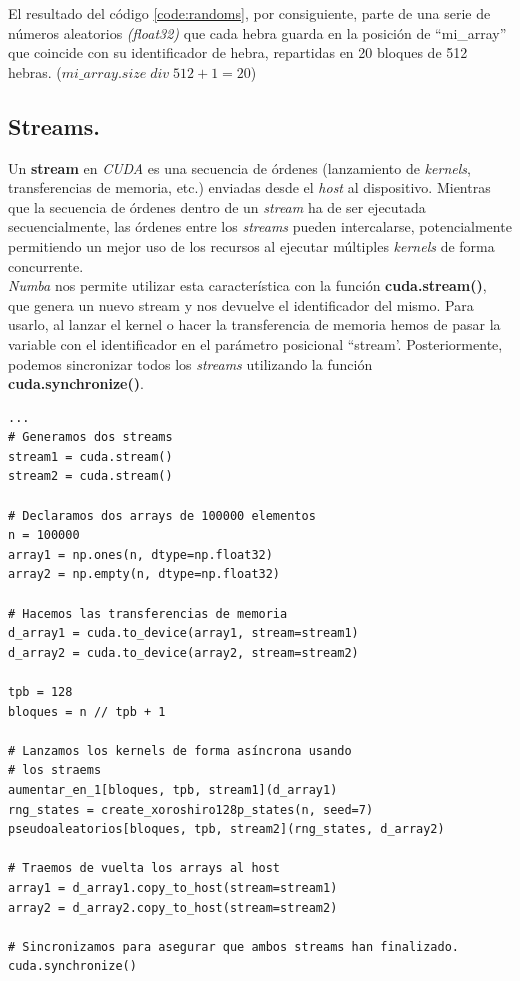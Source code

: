 El resultado del código \ref{code:randoms}, por consiguiente, parte de una serie de números aleatorios \textit{(float32)} que cada hebra guarda en la posición de ``mi\_array'' que coincide con su identificador de hebra, repartidas en 20 bloques de 512 hebras. ($mi\_array.size \;div \;512 + 1 = 20$)\\

\subsection{Streams.}
Un \textbf{stream} en \textit{CUDA} es una secuencia de órdenes (lanzamiento de \textit{kernels}, transferencias de memoria, etc.) enviadas desde el \textit{host} al dispositivo. Mientras que la secuencia de órdenes dentro de un \textit{stream} ha de ser ejecutada secuencialmente, las órdenes entre los \textit{streams} pueden intercalarse, potencialmente permitiendo un mejor uso de los recursos al ejecutar múltiples \textit{kernels} de forma concurrente. \\

\textit{Numba} nos permite utilizar esta característica con la función \textbf{cuda.stream()}, que genera un nuevo stream y nos devuelve el identificador del mismo. Para usarlo, al lanzar el kernel o hacer la transferencia de memoria hemos de pasar la variable con el identificador en el parámetro posicional ``stream'. Posteriormente, podemos sincronizar todos los \textit{streams} utilizando la función \textbf{cuda.synchronize()}. \\

\begin{code}
\begin{verbatim}
...
# Generamos dos streams
stream1 = cuda.stream()
stream2 = cuda.stream()

# Declaramos dos arrays de 100000 elementos
n = 100000 
array1 = np.ones(n, dtype=np.float32)
array2 = np.empty(n, dtype=np.float32)

# Hacemos las transferencias de memoria
d_array1 = cuda.to_device(array1, stream=stream1)
d_array2 = cuda.to_device(array2, stream=stream2)

tpb = 128
bloques = n // tpb + 1

# Lanzamos los kernels de forma asíncrona usando
# los straems
aumentar_en_1[bloques, tpb, stream1](d_array1)
rng_states = create_xoroshiro128p_states(n, seed=7)
pseudoaleatorios[bloques, tpb, stream2](rng_states, d_array2)

# Traemos de vuelta los arrays al host
array1 = d_array1.copy_to_host(stream=stream1)
array2 = d_array2.copy_to_host(stream=stream2)

# Sincronizamos para asegurar que ambos streams han finalizado.
cuda.synchronize()
\end{verbatim}
\label{code:streams}
\end{code}

